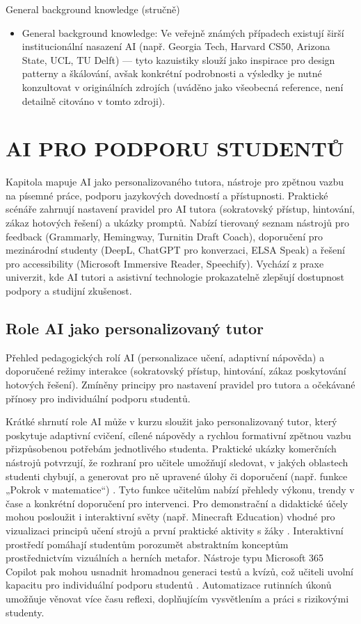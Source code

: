 \documentclass{report}%
\begin{document}
General background knowledge (stručně)
\begin{itemize}
  \item General background knowledge: Ve veřejně známých případech existují širší institucionální nasazení AI (např. Georgia Tech, Harvard CS50, Arizona State, UCL, TU Delft) — tyto kazuistiky slouží jako inspirace pro design patterny a škálování, avšak konkrétní podrobnosti a výsledky je nutné konzultovat v originálních zdrojích (uváděno jako všeobecná reference, není detailně citováno v tomto zdroji).
\end{itemize}%

%
\chapter{AI PRO PODPORU STUDENTŮ}%
Kapitola mapuje AI jako personalizovaného tutora, nástroje pro zpětnou vazbu na písemné práce, podporu jazykových dovedností a přístupnosti. Praktické scénáře zahrnují nastavení pravidel pro AI tutora (sokratovský přístup, hintování, zákaz hotových řešení) a ukázky promptů. Nabízí tierovaný seznam nástrojů pro feedback (Grammarly, Hemingway, Turnitin Draft Coach), doporučení pro mezinárodní studenty (DeepL, ChatGPT pro konverzaci, ELSA Speak) a řešení pro accessibility (Microsoft Immersive Reader, Speechify). Vychází z praxe univerzit, kde AI tutori a asistivní technologie prokazatelně zlepšují dostupnost podpory a studijní zkušenost.%
\section{Role AI jako personalizovaný tutor}%
Přehled pedagogických rolí AI (personalizace učení, adaptivní nápověda) a doporučené režimy interakce (sokratovský přístup, hintování, zákaz poskytování hotových řešení). Zmíněny principy pro nastavení pravidel pro tutora a očekávané přínosy pro individuální podporu studentů.%


%
Krátké shrnutí role
AI může v kurzu sloužit jako personalizovaný tutor, který poskytuje adaptivní cvičení, cílené nápovědy a rychlou formativní zpětnou vazbu přizpůsobenou potřebám jednotlivého studenta.
Praktické ukázky komerčních nástrojů potvrzují, že rozhraní pro učitele umožňují sledovat, v jakých oblastech studenti chybují, a generovat pro ně upravené úlohy či doporučení (např. funkce „Pokrok v matematice“) \cite{kb_ai_101_tipu_pdf_04e4a115_page_8_1}.
Tyto funkce učitelům nabízí přehledy výkonu, trendy v čase a konkrétní doporučení pro intervenci.
Pro demonstrační a didaktické účely mohou posloužit i interaktivní světy (např. Minecraft Education) vhodné pro vizualizaci principů učení strojů a první praktické aktivity s žáky \cite{kb_ai_101_tipu_pdf_04e4a115_page_15_2}.
Interaktivní prostředí pomáhají studentům porozumět abstraktním konceptům prostřednictvím vizuálních a herních metafor.
Nástroje typu Microsoft 365 Copilot pak mohou usnadnit hromadnou generaci testů a kvízů, což učiteli uvolní kapacitu pro individuální podporu studentů \cite{kb_ai_101_tipu_pdf_04e4a115_page_36_1}.
Automatizace rutinních úkonů umožňuje věnovat více času reflexi, doplňujícím vysvětlením a práci s rizikovými studenty.
\end{document}
